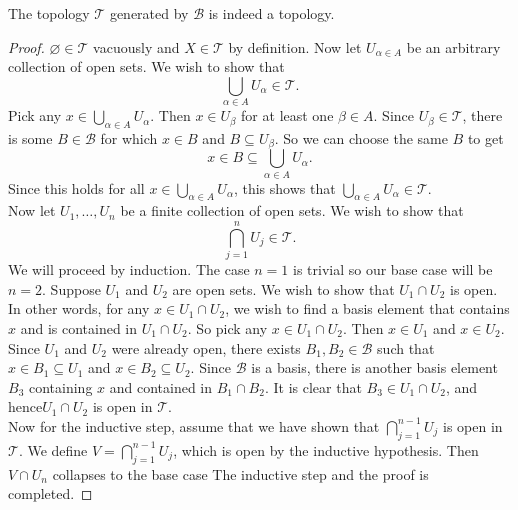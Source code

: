 \begin{theorem}
    The topology \( \mathscr{T} \) generated by \( \mathscr{B} \) is indeed a topology.
\end{theorem}
\begin{proof}
    \( \varnothing \in \mathscr{T} \) vacuously and \( X  \in \mathscr{T} \) by definition. Now let \( U_{\alpha \in A}  \) be an arbitrary collection of open sets. We wish to show that 
    \[ \bigcup_{\alpha \in A } U_{\alpha} \in \mathscr{T}. \]
Pick any \( x \in \bigcup_{\alpha \in A } U_{\alpha}  \). Then \( x \in U_{\beta} \) for at least one \( \beta \in A \). Since \( U_{\beta} \in \mathscr{T} \), there is some \( B \in \mathscr{B} \) for which \( x \in B \) and \( B \subseteq U_{\beta} \). So we can choose the same \( B \) to get 
\[ x \in B \subseteq  \bigcup_{\alpha \in A } U_{\alpha}.\]
Since this holds for all \( x \in \bigcup_{\alpha \in A } U_{\alpha}  \), this shows that \( \bigcup_{\alpha \in A } U_{\alpha} \in \mathscr{T} \).\\
Now let \( U_{1},\dots, U_{n} \) be a finite collection of open sets.  We wish to show that 
\[ \bigcap_{j=1}^{n} U_{j} \in \mathscr{T}. \]
We will proceed by induction. The case \( n=1 \) is trivial so our base case will be \( n=2 \). Suppose \( U_{1} \) and \( U_{2} \) are open sets. We wish to show that \( U_{1} \cap U_{2} \) is open. In other words, for any \( x \in U_{1} \cap U_{2} \), we wish to find a basis element that contains \( x \) and is contained in \( U_{1} \cap U_{2}. \) So pick any \( x \in U_{1} \cap U_{2} \). Then \( x \in U_{1} \) and \( x \in U_{2} \). Since \( U_{1} \) and \( U_{2} \) were already open, there exists \( B_{1}, B_{2} \in \mathscr{B} \) such that \( x \in B_{1} \subseteq U_{1} \) and \( x \in B_{2} \subseteq U_{2}\). Since \( \mathscr{B} \) is a basis, there is another basis element \( B_{3} \) containing \( x \) and contained in \( B_{1} \cap B_{2} \). It is clear that \( B_{3} \in U_{1} \cap U_{2} \), and hence\( U_{1} \cap U_{2} \) is open in \( \mathscr{T} \).\\
 Now for the inductive step, assume that we have shown that \( \bigcap_{j=1}^{n-1} U_{j} \) is open in \( \mathscr{T} \). We define \( V = \bigcap_{j=1}^{n-1} U_{j} \), which is open by the inductive hypothesis. Then \( V \cap U_{n} \) collapses to the base case The inductive step and the proof is completed.
\end{proof}

